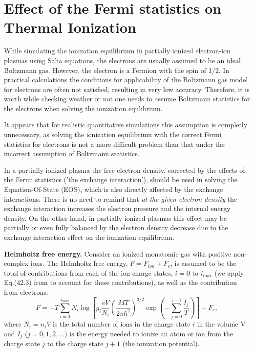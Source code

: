 
\section{Effect of the Fermi statistics on Thermal Ionization}

While simulating the ionization equilibrium in partially ionized electron-ion plasmas using Saha 
equations, the electrons are usually assumed to be an ideal Boltzmann gas.  However, the electron is a Fermion with the spin of 1/2. In practical calculations the conditions for
applicability of the Boltzmann gas model for electrons are often not satisfied, resulting in
very low accuracy. Therefore, it is worth while checking weather or not one needs to assume Boltzmann statistics for the electrons when solving the ionization equlibrium.

It appears that 
for realistic quantitative simulations this assumption is completly unnecessary, as solving the 
ionization equilibrium with the correct Fermi statistics for electrons is not a more difficult problem
than that under the incorrect assumption of Boltzmann statistics.

In a partially ionized plasma the free electron density, corrected by the effects of the Fermi statistics 
('the exchange interaction'), should be used in solving the Equation-Of-State (EOS), which is also 
directly affected by the exchange interactions. There is no need to remind that 
{\it at the given electron density} the exchange interaction increases the electron pressure and the 
internal energy density. On the other hand, in partially ionized plasmas this effect may 
be partially or even fully balanced by the electron density decrease due to the exchange interaction 
effect on the ionization equilibrium.  

{\bf Helmholtz free energy.} Consider an ionized monatomic gas with positive non-complex ions. The Helmholtz free energy,
$F=F_{ion}+F_e$, is assumed to be the total of contributions from each of the ion charge states,
$i=0$ to $i_{\max}$ (we apply Eq.(42.3) from \cite{ll} to account for these contributions), as well as the contribution from electrons:
\begin{equation}\label{freeenergy}
F=-T
\sum_{i=0}^{i_{max}}{
N_i\log\left[g_i
             \frac{eV}{N_i}\left(\frac{MT}{2\pi \hbar^2}\right)^{3/2}\exp \left(-\sum_{j=0}^{i-1}\frac{I_j}T \right)\right]}+F_e,
\end{equation}  
where $N_i=n_iV$ is the total number of ions in the charge state $i$ in the volume V and
$I_j$ ($j = 0, 1, 2, \dots$) is the energy needed to ionize an atom or ion from the charge state $j$ to the charge state $j+1$ (the ionization potential).

